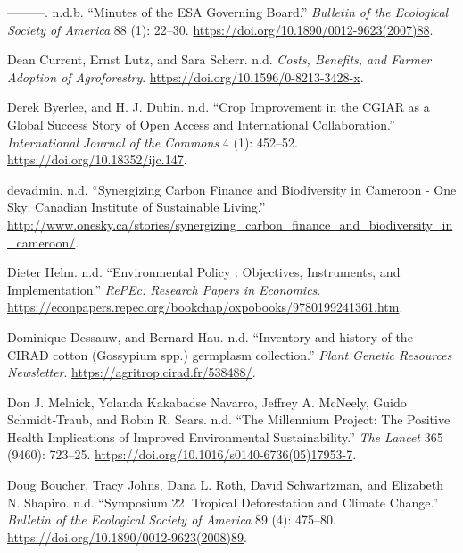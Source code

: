 \begin{CSLReferences}{1}{0}
---------. n.d.b. {``Minutes of the ESA Governing Board.''}
\emph{Bulletin of the Ecological Society of America} 88 (1): 22--30.
\url{https://doi.org/10.1890/0012-9623(2007)88}.

Dean Current, Ernst Lutz, and Sara Scherr. n.d. \emph{Costs, Benefits,
and Farmer Adoption of Agroforestry}.
\url{https://doi.org/10.1596/0-8213-3428-x}.

Derek Byerlee, and H. J. Dubin. n.d. {``Crop Improvement in the CGIAR as
a Global Success Story of Open Access and International
Collaboration.''} \emph{International Journal of the Commons} 4 (1):
452--52. \url{https://doi.org/10.18352/ijc.147}.

devadmin. n.d. {``Synergizing Carbon Finance and Biodiversity in
Cameroon - One Sky: Canadian Institute of Sustainable Living.''}
\url{http://www.onesky.ca/stories/synergizing_carbon_finance_and_biodiversity_in_cameroon/}.

Dieter Helm. n.d. {``Environmental Policy : Objectives, Instruments, and
Implementation.''} \emph{RePEc: Research Papers in Economics}.
\url{https://econpapers.repec.org/bookchap/oxpobooks/9780199241361.htm}.

Dominique Dessauw, and Bernard Hau. n.d. {``Inventory and history of the
CIRAD cotton (Gossypium spp.) germplasm collection.''} \emph{Plant
Genetic Resources Newsletter}. \url{https://agritrop.cirad.fr/538488/}.

Don J. Melnick, Yolanda Kakabadse Navarro, Jeffrey A. McNeely, Guido
Schmidt‐Traub, and Robin R. Sears. n.d. {``The Millennium Project: The
Positive Health Implications of Improved Environmental
Sustainability.''} \emph{The Lancet} 365 (9460): 723--25.
\url{https://doi.org/10.1016/s0140-6736(05)17953-7}.

Doug Boucher, Tracy Johns, Dana L. Roth, David Schwartzman, and
Elizabeth N. Shapiro. n.d. {``Symposium 22. Tropical Deforestation and
Climate Change.''} \emph{Bulletin of the Ecological Society of America}
89 (4): 475--80. \url{https://doi.org/10.1890/0012-9623(2008)89}.


\end{CSLReferences}
